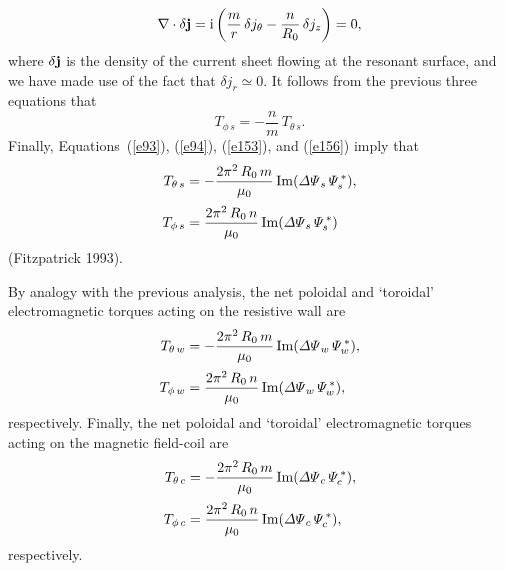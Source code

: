 \documentclass[notitlepage,12pt]{article}
\begin{document}
{\begin{equation}
\nabla \cdot \delta {\bf j} = {\rm i}\left(\frac{m}{r}\,\delta j_\theta - \frac{n}{R_0}\,\delta j_z\right) = 0,
\end{equation}
where $\delta{\bf j}$ is the density of the current sheet flowing at the resonant surface, and we have made use
of the fact that $\delta j_r\simeq 0$. 
 It follows from the previous three equations that
\begin{equation}\label{e156}
T_{\phi\,s} = - \frac{n}{m}\,T_{\theta\,s}.
\end{equation}
Finally, Equations~(\ref{e93}), (\ref{e94}), (\ref{e153}), and (\ref{e156}) imply that
\begin{align}\label{e157}
T_{\theta\,s} &= -\frac{2\pi^2\,R_0\,m}{\mu_0}\,{\rm Im}({\mit\Delta\Psi}_s\,{\mit\Psi}_s^{\,\ast}),\\[0.5ex]
T_{\phi\,s} &= \frac{2\pi^2\,R_0\,n}{\mu_0}\,{\rm Im}({\mit\Delta\Psi}_s\,{\mit\Psi}_s^{\,\ast})
\end{align}
(Fitzpatrick 1993).

By analogy with the previous analysis,  the net poloidal and `toroidal' electromagnetic torques acting on the
resistive wall are 
\begin{align}
T_{\theta\,w} &= -\frac{2\pi^2\,R_0\,m}{\mu_0}\,{\rm Im}({\mit\Delta\Psi}_w\,{\mit\Psi}_w^{\,\ast}),\\[0.5ex]
T_{\phi\,w} &= \frac{2\pi^2\,R_0\,n}{\mu_0}\,{\rm Im}({\mit\Delta\Psi}_w\,{\mit\Psi}_w^{\,\ast}),
\end{align}
respectively. 
Finally, 
the net poloidal and `toroidal' electromagnetic torques acting on the
magnetic field-coil are 
\begin{align}
T_{\theta\,c} &= -\frac{2\pi^2\,R_0\,m}{\mu_0}\,{\rm Im}({\mit\Delta\Psi}_c\,{\mit\Psi}_c^{\,\ast}),\\[0.5ex]
T_{\phi\,c} &= \frac{2\pi^2\,R_0\,n}{\mu_0}\,{\rm Im}({\mit\Delta\Psi}_c\,{\mit\Psi}_c^{\,\ast}),\label{e166}
\end{align}
respectively. 

}
\end{document}
